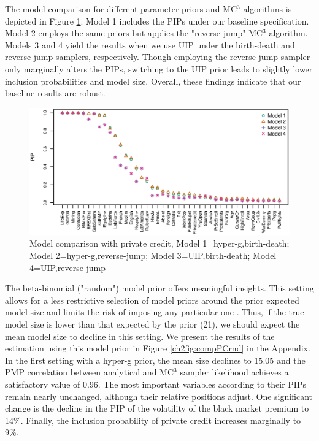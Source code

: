 The model comparison for different parameter priors and MC$^{3}$ algorithms is depicted in Figure \ref{ch2fig:compPC}. Model 1 includes the \acp{PIP} under our baseline specification. Model 2 employs the same priors but applies the "reverse-jump" MC$^{3}$ algorithm. Models 3 and 4 yield the results when we use \ac{UIP} under the birth-death and reverse-jump samplers, respectively. Though employing the reverse-jump sampler only marginally alters the \acp{PIP}, switching to the \ac{UIP} prior leads to slightly lower inclusion probabilities and model size. Overall, these findings indicate that our baseline results are robust.

% 
\begin{figure}[!ht]
	\begin{center}
		\includegraphics[width=\linewidth]{Figures/ch2/plotCompPC6011}
		\caption{Model comparison with private credit, Model 1=hyper-g,birth-death; Model 2=hyper-g,reverse-jump; Model 3=\ac{UIP},birth-death; Model 4=\ac{UIP},reverse-jump}
		\label{ch2fig:compPC}
	\end{center}
\end{figure}
%

The beta-binomial ("random") model prior offers meaningful insights. This setting allows for a less restrictive selection of model priors around the prior expected model size and limits the risk of imposing any particular one \citep{LeySteel2009}. Thus, if the true model size is lower than that expected by the prior (21), we should expect the mean model size to decline in this setting. 
%
We present the results of the estimation using this model prior in Figure \ref{ch2fig:compPCrnd} in the Appendix. In the first setting with a hyper-g prior, the mean size declines to 15.05 and the PMP correlation between analytical and MC$^{3}$ sampler likelihood achieves a satisfactory value of 0.96. The most important variables according to their \acp{PIP} remain nearly unchanged, although their relative positions adjust. One significant change is the decline in the PIP of the volatility of the black market premium to 14\%. Finally, the inclusion probability of private credit increases marginally to 9\%. 


